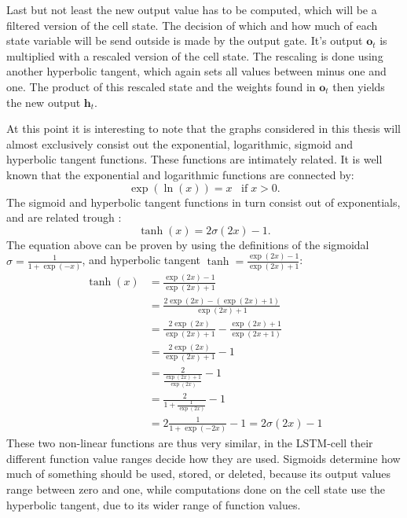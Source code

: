 Last but not least the new output value has to be computed, which will be a filtered version of the cell state. The decision of which and how much of each state variable will be send outside is made by the output gate. It's output $\mathbf{o}_t$ is multiplied with a rescaled version of the cell state. The rescaling is done using another hyperbolic tangent, which again sets all values between minus one and one. The product of this rescaled state and the weights found in $\mathbf{o}_t$ then yields the new output $\mathbf{h}_t$. 

At this point it is interesting to note that the graphs considered in this thesis will almost exclusively consist
out the exponential, logarithmic, sigmoid and hyperbolic tangent functions. These functions are intimately related. It is well known that the exponential and logarithmic functions are connected by:
\begin{equation}
\exp(\ln(x)) = x \;\;\; \text{if} \; x > 0.
\end{equation}
The sigmoid and hyperbolic tangent functions in turn consist out of exponentials, and are related trough \cite[page 15]{Graves2008}:
\begin{equation}
\tanh(x) = 2\sigma(2x) - 1.
\end{equation}
The equation above can be proven by using the definitions of the sigmoidal $\sigma = \frac{1}{1 + \exp(-x)}$, and hyperbolic tangent $\tanh = \frac{\exp(2x) - 1}{\exp(2x) + 1}$:
\begin{align}
\tanh(x) &= \frac{\exp(2x) - 1}{\exp(2x) + 1} \\
&= \frac{2\exp(2x) - (\exp(2x) + 1)}{\exp(2x) + 1} \\
&= \frac{2 \exp(2x)}{\exp(2x) + 1} - \frac{\exp(2x) + 1}{\exp(2x + 1)} \\
&= \frac{2 \exp(2x)}{\exp(2x) + 1} - 1 \\
&= \frac{2}{\frac{\exp(2x) + 1}{\exp(2x)}} - 1 \\
&= \frac{2}{1 + \frac{1}{\exp(2x)}} - 1 \\
&= 2\frac{1}{1 + \exp(-2x)} - 1 = 2\sigma(2x) - 1
\end{align}
These two non-linear functions are thus very similar, in the LSTM-cell their different function value ranges decide how they are used. Sigmoids determine how much of something should be used, stored, or deleted, because its output values range between zero and one, while computations done on the cell state use the hyperbolic tangent, due to its wider range of function values.  


